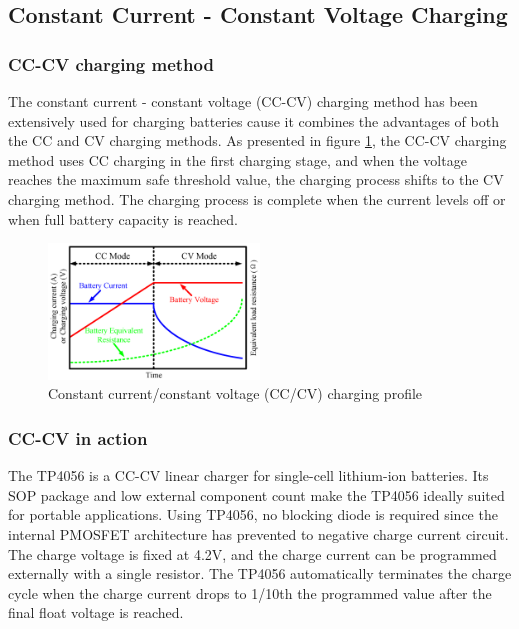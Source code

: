 \documentclass[\main/thesis.tex]{subfiles}
\begin{document}
\subsection{Constant Current - Constant Voltage Charging}

\subsubsection{CC-CV charging method}
The constant current - constant voltage (CC-CV) charging method has been extensively used for charging batteries cause it combines the advantages of both the CC and CV charging methods. As presented in figure \ref{fig:tp4056_cc_cv_profile}, the CC-CV charging method uses CC charging in the first charging stage, and when the voltage reaches the maximum safe threshold value, the charging process shifts to the CV charging method. The charging process is complete when the current levels off or when full battery capacity is reached.

\begin{figure}[H]
    \begin{center}
        \includegraphics[width=0.5\textwidth]{tp4056_cc_cv_profile.png}
    \end{center}
    \caption{Constant current/constant voltage (CC/CV) charging profile}
    \label{fig:tp4056_cc_cv_profile}
\end{figure}

\subsubsection{CC-CV in action}
The TP4056 is a CC-CV linear charger for single-cell lithium-ion batteries. Its SOP package and low external component count make the TP4056 ideally suited for portable applications. Using TP4056, no blocking diode is required since the internal PMOSFET architecture has prevented to negative charge current circuit. The charge voltage is
fixed at 4.2V, and the charge current can be programmed externally with a single resistor. The TP4056 automatically terminates the charge cycle when the charge current drops to 1/10th the programmed value after the final float voltage is reached. 
\end{document}
